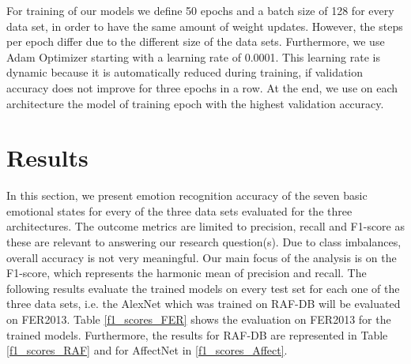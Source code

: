 \documentclass[a4paper, conference]{IEEEtran}
\begin{document}

For training of our models we define 50 epochs and a batch size of 128 for every data set, in order to have the same amount of weight updates. However, the steps per epoch differ due to the different size of the data sets. Furthermore, we use Adam Optimizer starting with a learning rate of 0.0001. This learning rate is dynamic because it is automatically reduced during training, if validation accuracy does not improve for three epochs in a row. At the end, we use on each architecture the model of training epoch with the highest validation accuracy.


\section{Results}
\label{results}

In this section, we present emotion recognition accuracy of the seven basic emotional states for every of the three data sets evaluated for the three architectures. The outcome metrics are limited to precision, recall and F1-score as these are relevant to answering our research question(s). Due to class imbalances, overall accuracy is not very meaningful. Our main focus of the analysis is on the F1-score, which represents the harmonic mean of precision and recall. The following results evaluate the trained models on every test set for each one of the three data sets, i.e. the AlexNet which was trained on RAF-DB will be evaluated on FER2013. Table \ref{f1_scores_FER} shows the evaluation on FER2013 for the trained models. Furthermore, the results for RAF-DB are represented in Table \ref{f1_scores_RAF} and for AffectNet in \ref{f1_scores_Affect}.%
\end{document}
